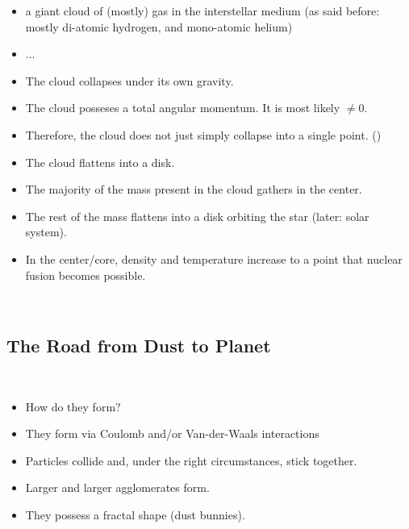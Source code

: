     \begin{itemize}
        \item a giant cloud of (mostly) gas in the interstellar medium 
              (as said before: mostly di-atomic hydrogen, and mono-atomic helium)
    \end{itemize}
    \begin{itemize}
        \item ...
    \end{itemize}
    \begin{itemize}
        \item The cloud collapses under its own gravity. 
        \item The cloud posseses a total angular momentum. It is most likely $\neq 0$.
        \item Therefore, the cloud does not just simply collapse into a single point. 
              ()
        \item The cloud flattens into a disk.
        \item The majority of the mass present in the cloud gathers in the center.
        \item The rest of the mass flattens into a disk orbiting the star 
              (later: solar system).
        \item In the center/core, density and temperature increase to a point that nuclear 
              fusion becomes possible.
    \end{itemize}

     \\

\clearpage\subsection{The Road from Dust to Planet}

     \\

    \begin{itemize}
        \item How do they form?
    \end{itemize}

    \begin{itemize}
        \item They form via Coulomb and/or Van-der-Waals interactions
        \item Particles collide and, under the right circumstances, stick together.
        \item Larger and larger agglomerates form.
        \item They possess a fractal shape (dust bunnies).
    \end{itemize}

